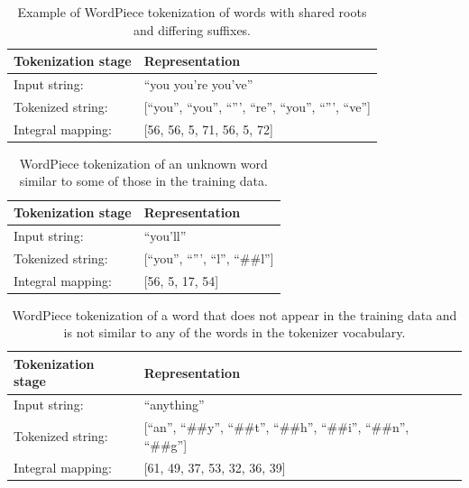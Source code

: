 \documentclass[12pt]{article}
\begin{document}
\begin{table}[!t]
    \centering
    \begin{tabular}{l l}
        \toprule
        Tokenization stage & Representation                                            \\
        \midrule
        Input string:      & ``you you're you've''                                     \\
        Tokenized string:  & [``you'', ``you'', ``''', ``re'', ``you'', ``''', ``ve''] \\
        Integral mapping:  & [56, 56, 5, 71, 56, 5, 72]                                \\
        \bottomrule
    \end{tabular}
    \caption{Example of WordPiece tokenization of words with shared roots and differing suffixes.}
    \label{tab:wordpiece_tokenization_shared_roots_example}
\end{table}

\begin{table}[!t]
    \centering
    \begin{tabular}{l l}
        \toprule
        Tokenization stage & Representation                     \\
        \midrule
        Input string:      & ``you'll''                         \\
        Tokenized string:  & [``you'', ``''', ``l'', ``\#\#l''] \\
        Integral mapping:  & [56, 5, 17, 54]                    \\
        \bottomrule
    \end{tabular}
    \caption{WordPiece tokenization of an unknown word similar to some of those in the training data.}
    \label{tab:wordpiece_unk_word_similar}
\end{table}

\begin{table}[!t]
    \centering
    \begin{tabular}{l l}
        \toprule
        Tokenization stage & Representation                                                             \\
        \midrule
        Input string:      & ``anything''                                                               \\
        Tokenized string:  & [``an'', ``\#\#y'', ``\#\#t'', ``\#\#h'', ``\#\#i'', ``\#\#n'', ``\#\#g''] \\
        Integral mapping:  & [61, 49, 37, 53, 32, 36, 39]                                               \\
        \bottomrule
    \end{tabular}
    \caption{WordPiece tokenization of a word that does not appear in the training data and is not similar to any of the words in the tokenizer
        vocabulary.}
    \label{tab:wordpiece_unk_word}
\end{table}
\end{document}
